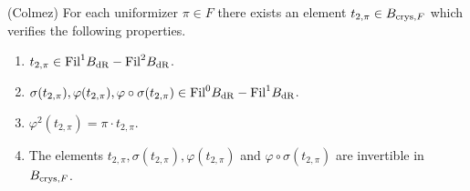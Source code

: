 \documentclass[11pt]{amsart}
\begin{document}
\begin{prop}\label{idearef} (Colmez)
For each uniformizer $\pi \in F$ there exists an element $t_{2,\pi} \in B_{\textnormal{crys},F}$  which verifies the following properties.
\begin{enumerate}
\item $t_{2,\pi}  \in \textnormal{Fil} ^{1} B_{\mathrm{dR}}-\textnormal{Fil} ^{2} B_{\mathrm{dR}}$.
\item $\sigma (t_{2,\pi} ) , \varphi (t_{2,\pi} ) , \varphi \circ \sigma (t_{2,\pi} ) \in \textnormal{Fil} ^{0} B_{\mathrm{dR}}-\textnormal{Fil} ^{1} B_{\mathrm{dR}}$.
\item  $ \varphi^2(t_{2,\pi} ) = \pi \cdot t_{2,\pi} $.
\item The elements $t_{2,\pi}  ,  \sigma(t_{2,\pi} ), \varphi (t_{2,\pi} )$ and $ \varphi \circ \sigma (t_{2,\pi} )  $ are invertible in $B_{\textnormal{crys},F}$.
\end{enumerate}
\end{prop}
\end{document}
